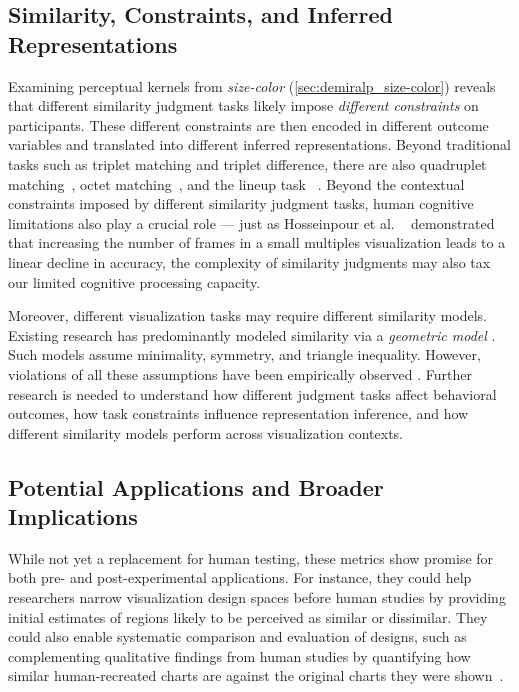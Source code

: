 \documentclass[sigconf]{acmart}
\begin{document}
\subsection{Similarity, Constraints, and Inferred Representations}

Examining perceptual kernels from \textit{size-color} (\cref{sec:demiralp_size-color}) reveals that different similarity judgment tasks likely impose \textit{different constraints} on participants. These different constraints are then encoded in different outcome variables and translated into different inferred representations. Beyond traditional tasks such as triplet matching and triplet difference, there are also quadruplet matching~\cite{gogolou2018comparing}, octet matching~\cite{roads2017improving}, and the lineup task ~\cite{buja2009statistical}. Beyond the contextual constraints imposed by different similarity judgment tasks, human cognitive limitations also play a crucial role --- just as Hosseinpour et al. ~\cite{hosseinpour2024examining} demonstrated that increasing the number of frames in a small multiples visualization leads to a linear decline in accuracy, the complexity of similarity judgments may also tax our limited cognitive processing capacity.

Moreover, different visualization tasks may require different similarity models. Existing research has predominantly modeled similarity via a \textit{geometric model} \cite{torgerson1965multidimensional}. Such models assume minimality, symmetry, and triangle inequality. However, violations of all these assumptions have been empirically observed \cite{tversky1977features}. Further research is needed to understand how different judgment tasks affect behavioral outcomes, how task constraints influence representation inference, and how different similarity models perform across visualization contexts. 

\subsection{Potential Applications and Broader Implications}

While not yet a replacement for human testing, these metrics show promise for both pre- and post-experimental applications. For instance, they could help researchers narrow visualization design spaces before human studies by providing initial estimates of regions likely to be perceived as similar or dissimilar. They could also enable systematic comparison and evaluation of designs, such as complementing qualitative findings from human studies by quantifying how similar human-recreated charts are against the original charts they were shown~\cite{Proma2024}.
\end{document}
